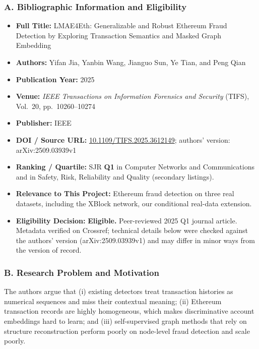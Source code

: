 \documentclass[11pt,a4paper]{article}
\begin{document}
\subsubsection*{A. Bibliographic Information and Eligibility}
\begin{itemize}[leftmargin=*]
    \item \textbf{Full Title:} LMAE4Eth: Generalizable and Robust Ethereum Fraud Detection by Exploring Transaction Semantics and Masked Graph Embedding
    \item \textbf{Authors:} Yifan Jia, Yanbin Wang, Jianguo Sun, Ye Tian, and Peng Qian
    \item \textbf{Publication Year:} 2025
    \item \textbf{Venue:} \textit{IEEE Transactions on Information Forensics and Security} (TIFS), Vol.~20, pp.~10260--10274
    \item \textbf{Publisher:} IEEE
    \item \textbf{DOI / Source URL:} \href{https://doi.org/10.1109/TIFS.2025.3612149}{10.1109/TIFS.2025.3612149}; authors' version: arXiv:2509.03939v1
    \item \textbf{Ranking / Quartile:} SJR \textbf{Q1} in Computer Networks and Communications and in Safety, Risk, Reliability and Quality (secondary listings).
    \item \textbf{Relevance to This Project:} Ethereum fraud detection on three real datasets, including the XBlock network, our conditional real-data extension.
    \item \textbf{Eligibility Decision:} \textbf{Eligible.} Peer-reviewed 2025 Q1 journal article. Metadata verified on Crossref; technical details below were checked against the authors' version (arXiv:2509.03939v1) and may differ in minor ways from the version of record.
\end{itemize}

\subsubsection*{B. Research Problem and Motivation}
The authors argue that (i) existing detectors treat transaction histories as numerical sequences and miss their contextual meaning; (ii) Ethereum transaction records are highly homogeneous, which makes discriminative account embeddings hard to learn; and (iii) self-supervised graph methods that rely on structure reconstruction perform poorly on node-level fraud detection and scale poorly.
\end{document}
